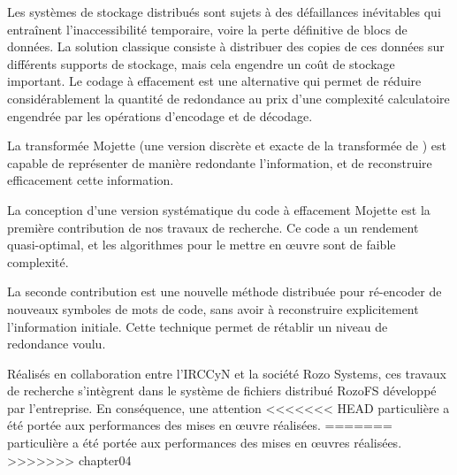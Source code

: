 
Les systèmes de stockage distribués sont sujets à des défaillances inévitables
qui entraînent l'inaccessibilité temporaire, voire la perte définitive de blocs
de données. La solution classique consiste à distribuer des copies de ces
données sur différents supports de stockage, mais cela engendre un coût de
stockage important.
%
Le codage à effacement est une alternative qui permet de réduire
considérablement la quantité de redondance au prix d'une complexité
calculatoire engendrée par les opérations d'encodage et de décodage.

La transformée Mojette (une version discrète et exacte de la transformée
de \radon) est capable de représenter de manière redondante l'information,
et de reconstruire efficacement cette information. %

La conception d'une version systématique du code à effacement Mojette est la
première contribution de nos travaux de recherche. Ce code a un rendement
quasi-optimal, et les algorithmes pour le mettre en œuvre sont de faible
complexité.

La seconde contribution est une nouvelle méthode distribuée pour ré-encoder de
nouveaux symboles de mots de code, sans avoir à reconstruire explicitement
l'information initiale. Cette technique permet de rétablir un niveau de
redondance voulu.

Réalisés en collaboration entre l'IRCCyN et la société Rozo Systems, ces
travaux de recherche s'intègrent dans le système de fichiers
distribué RozoFS développé par l'entreprise. En conséquence, une attention
<<<<<<< HEAD
particulière a été portée aux performances des mises en œuvre réalisées.
=======
particulière a été portée aux performances des mises en œuvres réalisées.
>>>>>>> chapter04

